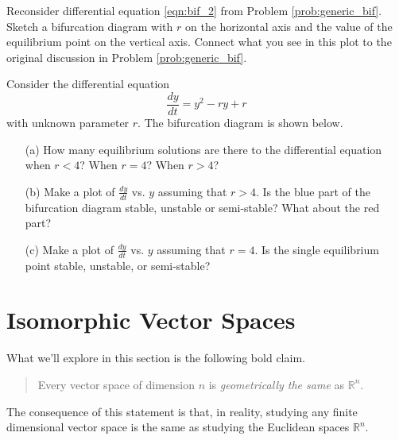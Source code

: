 \begin{problem}
    Reconsider differential equation \eqref{eqn:bif_2} from Problem
    \ref{prob:generic_bif}.  Sketch a bifurcation diagram with $r$ on the horizontal axis
    and the value of the equilibrium point on the vertical axis.  Connect what you see in
    this plot to the original discussion in Problem \ref{prob:generic_bif}.
\end{problem}

\begin{problem}
    Consider the differential equation 
    \[ \frac{dy}{dt} = y^2 - ry + r \]
    with unknown parameter $r$.  The bifurcation diagram is shown below.  
\begin{center}
\end{center}
\begin{enumerate}
    \item[(a)] How many equilibrium solutions are there to the differential equation when
        $r<4$? When $r=4$? When $r>4$?
    \item[(b)] Make a plot of $\frac{dy}{dt}$ vs. $y$ assuming that $r > 4$.  Is the blue
        part of the bifurcation diagram stable, unstable or semi-stable?  What about the
        red part?
    \item[(c)] Make a plot of $\frac{dy}{dt}$ vs. $y$ assuming that $r = 4$.  Is the
        single equilibrium point stable, unstable, or semi-stable?
\end{enumerate}
\end{problem}



\newpage\section{Isomorphic Vector Spaces}
What we'll explore in this section is
the following bold claim.
\begin{quote}
    Every vector space of dimension $n$ is {\it geometrically the same} as $\mathbb{R}^n$.
\end{quote}
The consequence of this statement is that, in reality, studying any finite dimensional
vector space is the same as studying the Euclidean spaces $\mathbb{R}^n$.

